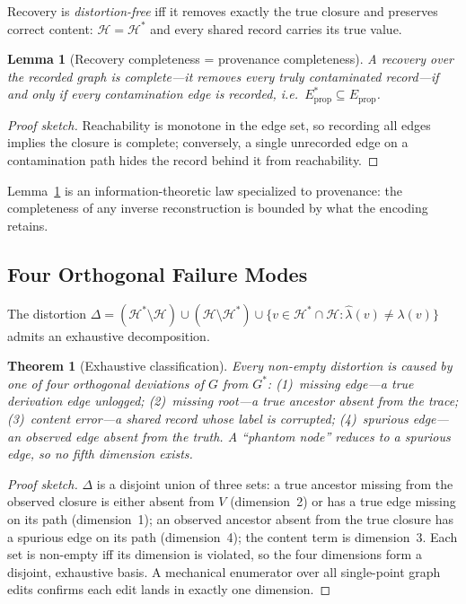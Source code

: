 \documentclass[11pt]{article}
\newtheorem{theorem}{Theorem}
\newtheorem{lemma}{Lemma}
\theoremstyle{remark}
\begin{document}
Recovery is \emph{distortion-free} iff it removes exactly the true closure and
preserves correct content: $\mathcal{H}=\mathcal{H}^{*}$ and every shared record
carries its true value.

\begin{lemma}[Recovery completeness = provenance completeness]
\label{lem:complete}
A recovery over the recorded graph is complete---it removes every truly contaminated
record---if and only if every contamination edge is recorded, i.e.\
$E^{*}_{\mathrm{prop}}\subseteq E_{\mathrm{prop}}$.
\end{lemma}

\begin{proof}[Proof sketch]
Reachability is monotone in the edge set, so recording all edges implies the closure
is complete; conversely, a single unrecorded edge on a contamination path hides the
record behind it from reachability.
\end{proof}

Lemma~\ref{lem:complete} is an information-theoretic law specialized to provenance:
the completeness of any inverse reconstruction is bounded by what the encoding
retains.

\subsection{Four Orthogonal Failure Modes}
\label{sec:four}

The distortion $\Delta = (\mathcal{H}^{*}\setminus\mathcal{H}) \cup
(\mathcal{H}\setminus\mathcal{H}^{*}) \cup \{v\in\mathcal{H}^{*}\cap\mathcal{H}:
\hat\lambda(v)\ne\lambda(v)\}$ admits an exhaustive decomposition.

\begin{theorem}[Exhaustive classification]
\label{thm:four}
Every non-empty distortion is caused by one of four orthogonal deviations of $G$ from
$G^{*}$: (1)~\emph{missing edge}---a true derivation edge unlogged; (2)~\emph{missing
root}---a true ancestor absent from the trace; (3)~\emph{content error}---a shared
record whose label is corrupted; (4)~\emph{spurious edge}---an observed edge absent
from the truth. A ``phantom node'' reduces to a spurious edge, so no fifth dimension
exists.
\end{theorem}

\begin{proof}[Proof sketch]
$\Delta$ is a disjoint union of three sets: a true ancestor missing from the observed
closure is either absent from $V$ (dimension~2) or has a true edge missing on its
path (dimension~1); an observed ancestor absent from the true closure has a spurious
edge on its path (dimension~4); the content term is dimension~3. Each set is non-empty
iff its dimension is violated, so the four dimensions form a disjoint, exhaustive
basis. A mechanical enumerator over all single-point graph edits confirms each edit
lands in exactly one dimension.
\end{proof}
\end{document}
